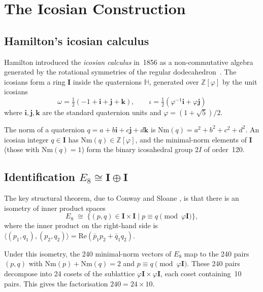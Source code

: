 \section{The Icosian Construction}
\label{sec:e8-icosian}

\subsection{Hamilton's icosian calculus}
\label{subsec:icosian-hamilton}

Hamilton introduced the \emph{icosian calculus} in~1856 as a
non-commutative algebra generated by the rotational symmetries of the
regular dodecahedron~\cite{coxeter_regular_polytopes}.  The icosians
form a ring \(\mathbf{I}\) inside the quaternions \(\mathbb{H}\),
generated over \(\mathbb{Z}[\varphi]\) by the unit icosians
\[
  \omega = \tfrac{1}{2}(-1 + \mathbf{i} + \mathbf{j} + \mathbf{k}),
  \qquad
  \iota  = \tfrac{1}{2}(\varphi^{-1}\mathbf{i} + \varphi\mathbf{j})
\]
where \(\mathbf{i},\mathbf{j},\mathbf{k}\) are the standard
quaternion units and \(\varphi = (1+\sqrt{5})/2\).

The norm of a quaternion
\(q = a + b\mathbf{i} + c\mathbf{j} + d\mathbf{k}\) is
\(\mathrm{Nm}(q) = a^2 + b^2 + c^2 + d^2\).  An icosian integer
\(q \in \mathbf{I}\) has
\(\mathrm{Nm}(q) \in \mathbb{Z}[\varphi]\), and the minimal-norm
elements of \(\mathbf{I}\) (those with \(\mathrm{Nm}(q) = 1\)) form
the binary icosahedral group \(2I\) of order~120.

\subsection{Identification \texorpdfstring{$E_8 \cong \mathbf{I} \oplus \mathbf{I}$}{E8 ≅ I⊕I}}
\label{subsec:icosian-e8}

The key structural theorem, due to Conway and Sloane
\cite{conway_sphere_packings}, is that there is an isometry of inner
product spaces
\[
  E_8 \;\cong\; \bigl\{ (p, q) \in \mathbf{I} \times \mathbf{I} \;\big|\;
    p \equiv q \pmod{\varphi \mathbf{I}}
  \bigr\},
\]
where the inner product on the right-hand side is
\(\langle (p_1,q_1), (p_2,q_2) \rangle =
\mathrm{Re}(\bar{p}_1 p_2 + \bar{q}_1 q_2)\).

Under this isometry, the 240 minimal-norm vectors of \(E_8\) map to
the 240 pairs \((p,q)\) with \(\mathrm{Nm}(p) + \mathrm{Nm}(q) = 2\)
and \(p \equiv q \pmod{\varphi \mathbf{I}}\).  These 240 pairs
decompose into 24 cosets of the sublattice
\(\varphi \mathbf{I} \times \varphi \mathbf{I}\), each coset
containing~10 pairs.  This gives the factorisation
\(240 = 24 \times 10\).

